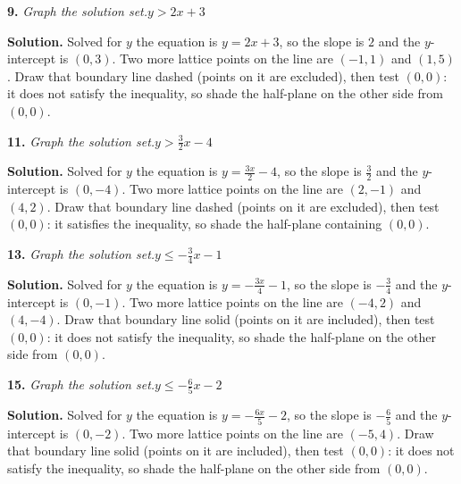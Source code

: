 \documentclass{ximera}
\begin{document}
\begin{problem}
\textbf{9.} \emph{Graph the solution set.}\quad $y > 2x + 3$              \figbox{\gridsm}

\begin{hint}
\textbf{Solution.} Solved for $y$ the equation is $y=2x + 3$, so the slope is $2$ and the $y$-intercept is $(0,3)$. Two more lattice points on the line are $(-1,1)$ and $(1,5)$. Draw that boundary line dashed (points on it are excluded), then test $(0,0)$: it does not satisfy the inequality, so shade the half-plane on the other side from $(0,0)$.
\end{hint}
\end{problem}

\begin{problem}
\textbf{11.} \emph{Graph the solution set.}\quad $y > \frac{3}{2}x - 4$    \figbox{\gridsm}

\begin{hint}
\textbf{Solution.} Solved for $y$ the equation is $y=\frac{3x}{2} - 4$, so the slope is $\frac{3}{2}$ and the $y$-intercept is $(0,-4)$. Two more lattice points on the line are $(2,-1)$ and $(4,2)$. Draw that boundary line dashed (points on it are excluded), then test $(0,0)$: it satisfies the inequality, so shade the half-plane containing $(0,0)$.
\end{hint}
\end{problem}

\begin{problem}
\textbf{13.} \emph{Graph the solution set.}\quad $y \le -\frac{3}{4}x - 1$ \figbox{\gridsm}

\begin{hint}
\textbf{Solution.} Solved for $y$ the equation is $y=-\frac{3x}{4} - 1$, so the slope is $-\frac{3}{4}$ and the $y$-intercept is $(0,-1)$. Two more lattice points on the line are $(-4,2)$ and $(4,-4)$. Draw that boundary line solid (points on it are included), then test $(0,0)$: it does not satisfy the inequality, so shade the half-plane on the other side from $(0,0)$.
\end{hint}
\end{problem}

\begin{problem}
\textbf{15.} \emph{Graph the solution set.}\quad $y \le -\frac{6}{5}x - 2$ \figbox{\gridsm}

\begin{hint}
\textbf{Solution.} Solved for $y$ the equation is $y=-\frac{6x}{5} - 2$, so the slope is $-\frac{6}{5}$ and the $y$-intercept is $(0,-2)$. Two more lattice points on the line are $(-5,4)$. Draw that boundary line solid (points on it are included), then test $(0,0)$: it does not satisfy the inequality, so shade the half-plane on the other side from $(0,0)$.
\end{hint}
\end{problem}
\end{document}
